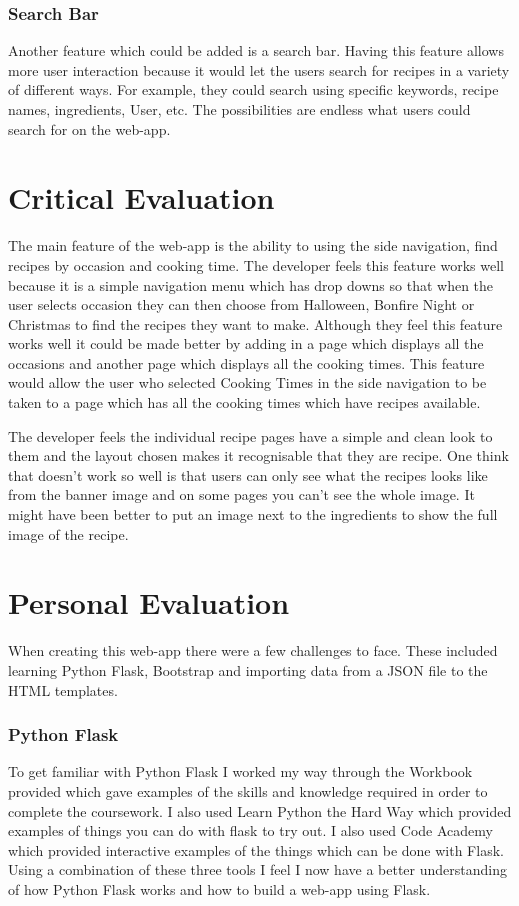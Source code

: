 \documentclass[10pt, a4paper]{article}
\begin{document}
    \subsubsection{Search Bar}
    Another feature which could be added is a search bar. Having this feature allows more user interaction because it would let the users search for recipes in a variety of different ways. For example, they could search using specific keywords, recipe names, ingredients, User, etc. The possibilities are endless what users could search for on the web-app.

    \vfill\null \columnbreak
    \section{Critical Evaluation}
    The main feature of the web-app is the ability to using the side navigation, find recipes by occasion and cooking time. The developer  feels this feature works well because it is a simple navigation menu which has drop downs so that when the user selects occasion they can then choose from Halloween, Bonfire Night or Christmas to find the recipes they want to make. Although they feel this feature works well it could be made better by adding in a page which displays all the occasions and another page which displays all the cooking times. This feature would allow the user who selected Cooking Times in the side navigation to be taken to a page which has all the cooking times which have recipes available. 

    The developer feels the individual recipe pages have a simple and clean look to them and the layout chosen makes it recognisable that they are recipe. One think that doesn't work so well is that users can only see what the recipes looks like from the banner image and on some pages you can't see the whole image. It might have been better to put an image next to the ingredients to show the full image of the recipe.
    
    
    \section{Personal Evaluation}
    When creating this web-app there were a few challenges to face. These included learning Python Flask, Bootstrap and importing data from a JSON file to the HTML templates. 

    \subsubsection{Python Flask}
    To get familiar with Python Flask I worked my way through the Workbook provided\cite{Wells} which gave examples of the skills and knowledge required in order to complete the coursework. I also used Learn Python the Hard Way\cite{Shaw} which provided examples of things you can do with flask to try out. I also used Code Academy\cite{Code} which provided interactive examples of the things which can be done with Flask. Using a combination of these three tools I feel I now have a better understanding of how Python Flask works and how to build a web-app using Flask.
\end{document}
